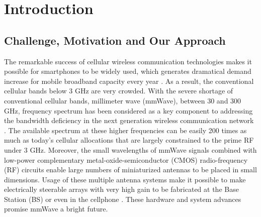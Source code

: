 \chapter{Introduction}\label{ch:Intro}
\section{Challenge, Motivation and Our Approach}
\label{sec:1}
\par The remarkable success of cellular wireless communication technologies makes it possible for smartphones to be widely used, which generates dramatical demand increase for mobile broadband capacity every year \cite{index2013global, cerwall2011ericsson, pujol2011mobile}. As a result, the conventional cellular bands below 3 GHz are very crowded. With the severe shortage of conventional cellular bands, millimeter wave (mmWave), between $30$ and $300$ GHz, frequency spectrum has been considered as a key component to addressing the bandwidth deficiency in the next generation wireless communication network \cite{khan2011mmwave, pi2011introduction, rappaport2011state, pietraski2012millimeter, rangan2014millimeter}. The available spectrum at these higher frequencies can be easily 200 times as much as today's cellular allocations that are largely constrained to the prime RF under 3 GHz. Moreover, the small wavelengths of mmWave signals combined with low-power complementary metal-oxide-semiconductor (CMOS) radio-frequency (RF) circuits enable large numbers of miniaturized antennas to be placed in small dimensions. Usage of these multiple antenna systems make it possible to make electrically steerable arrays with very high gain to be fabricated at the Base Station (BS) or even in the cellphone \cite{doan2004design, zhang2009antenna, gutierrez2009chip, rajagopal2011antenna}. These hardware and system advances promise mmWave a bright future.
